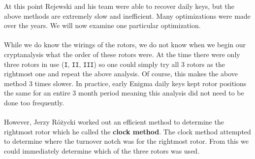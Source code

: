 At this point Rejewski and his team were able to recover daily keys, but the above methods are extremely slow and inefficient. Many optimizations were made over the years. We will now examine one particular optimization.
\\\\While we do know the wirings of the rotors, we do not know when we begin our cryptanalysis what the order of these rotors were. At the time there were only three rotors in use (\texttt{I}, \texttt{II}, \texttt{III}) so one could simply try all 3 rotors as the rightmost one and repeat the above analysis. Of course, this makes the above method 3 times slower. In practice, early Enigma daily keys kept rotor positions the same for an entire 3 month period meaning this analysis did not need to be done too frequently.
\\\\However, Jerzy Różycki worked out an efficient method to determine the rightmost rotor which he called the {\bf{clock method}}. The clock method attempted to determine where the turnover notch was for the rightmost rotor. From this we could immediately determine which of the three rotors was used.


